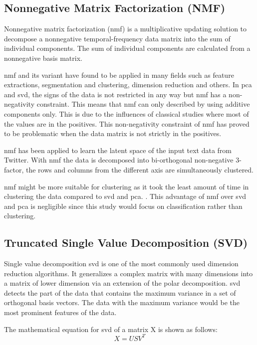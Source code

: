 \subsection{Nonnegative Matrix Factorization (NMF)}
Nonnegative matrix factorization (\ac{nmf}) is a multiplicative updating solution to decompose a nonnegative temporal-frequency data matrix into the sum of individual components. The sum of individual components are calculated from a nonnegative basis matrix. \cite{nmfBook}

\Ac{nmf} and its variant have found to be applied in many fields such as feature extractions, segmentation and clustering, dimension reduction and others. In \ac{pca} and \ac{svd}, the signs of the data is not restricted in any way but \ac{nmf} has a non-negativity constraint. This means that \ac{nmf} can only described by using additive components only. This is due to the influences of classical studies where most of the values are in the positives. This non-negativity constraint of \ac{nmf} has proved to be problematic when the data matrix is not strictly in the positives. \cite{semiNmfPca}

\Ac{nmf} has been applied to learn the latent space of the input text data from Twitter. With \ac{nmf} the data is decomposed into bi-orthogonal non-negative 3-factor, the rows and columns from the different axis are simultaneously clustered. \cite{nmfTwitter}

\Ac{nmf} might be more suitable for clustering as it took the least amount of time in clustering the data compared to \ac{svd} and \ac{pca}. \cite{nmfClustering}. This advantage of \ac{nmf} over \ac{svd} and \ac{pca} is negligible since this study would focus on classification rather than clustering.\\

\clearpage
\subsection{Truncated Single Value Decomposition (SVD)}
Single value decomposition \ac{svd} is one of the most commonly used dimension reduction algorithms. It generalizes a complex matrix with many dimensions into a matrix of lower dimension via an extension of the polar decomposition. \Ac{svd} detects the part of the data that contains the maximum variance in a set of orthogonal basis vectors. The data with the maximum variance would be the most prominent features of the data. \cite{svdDef}

The mathematical equation for \ac{svd} of a matrix X is shown as follows:
\begin{equation}
X = USV^{T}
\end{equation}

